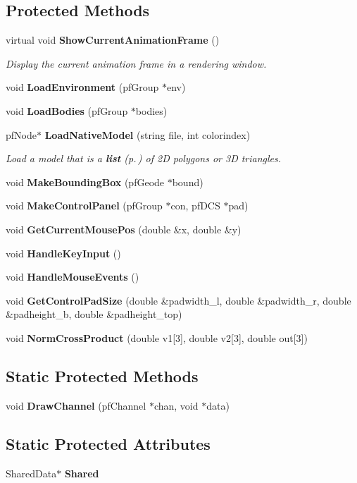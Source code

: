 \subsection*{Protected Methods}
\begin{CompactItemize}
\item 
virtual void {\bf Show\-Current\-Animation\-Frame} ()
\begin{CompactList}\small\item\em Display the current animation frame in a rendering window.\item\end{CompactList}\item 
void {\bf Load\-Environment} (pf\-Group $\ast$env)
\item 
void {\bf Load\-Bodies} (pf\-Group $\ast$bodies)
\item 
pf\-Node$\ast$ {\bf Load\-Native\-Model} (string file, int colorindex)
\begin{CompactList}\small\item\em Load a model that is a {\bf list} {\rm (p.\,\pageref{classlist})} of 2D polygons or 3D triangles.\item\end{CompactList}\item 
void {\bf Make\-Bounding\-Box} (pf\-Geode $\ast$bound)
\item 
void {\bf Make\-Control\-Panel} (pf\-Group $\ast$con, pf\-DCS $\ast$pad)
\item 
void {\bf Get\-Current\-Mouse\-Pos} (double \&x, double \&y)
\item 
void {\bf Handle\-Key\-Input} ()
\item 
void {\bf Handle\-Mouse\-Events} ()
\item 
void {\bf Get\-Control\-Pad\-Size} (double \&padwidth\_\-l, double \&padwidth\_\-r, double \&padheight\_\-b, double \&padheight\_\-top)
\item 
void {\bf Norm\-Cross\-Product} (double v1[3], double v2[3], double out[3])
\end{CompactItemize}
\subsection*{Static Protected Methods}
\begin{CompactItemize}
\item 
void {\bf Draw\-Channel} (pf\-Channel $\ast$chan, void $\ast$data)
\end{CompactItemize}
\subsection*{Static Protected Attributes}
\begin{CompactItemize}
\item 
Shared\-Data$\ast$ {\bf Shared}
\end{CompactItemize}


